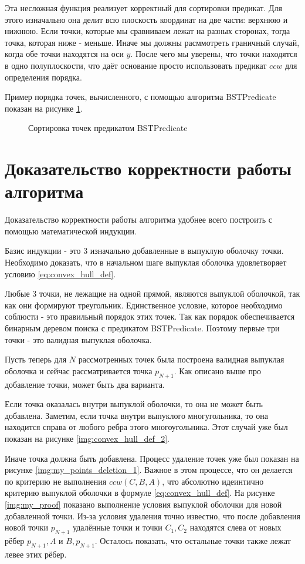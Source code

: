Эта несложная функция реализует корректный для сортировки предикат. Для этого изначально она делит всю плоскость координат на две части: верхнюю и нижнюю. Если точки, которые мы сравниваем лежат на разных сторонах, тогда точка, которая ниже - меньше. Иначе мы должны расммотреть граничный случай, когда обе точки находятся на оси $y$. После чего мы уверены, что точки находятся в одно полуплоскости, что даёт основание просто использовать предикат $ccw$ для определения порядка.

Пример порядка точек, вычисленного, с помощью алгоритма BSTPredicate показан на рисунке \ref{img:BSTPred_ordering}.

\begin{figure}[H]
	\centering
	
	\caption{Сортировка точек предикатом BSTPredicate}
	\label{img:BSTPred_ordering}
\end{figure}

\section{Доказательство корректности работы алгоритма} \label{subsect2_3}

Доказательство корректности работы алгоритма удобнее всего построить с помощью математической индукции.

Базис индукции - это 3 изначально добавленные в выпуклую оболочку точки. Необходимо доказать, что в начальном шаге выпуклая оболочка удовлетворяет условию \ref{eq:convex_hull_def}.

Любые 3 точки, не лежащие на одной прямой, являются выпуклой оболочкой, так как они формируют треугольник. Единственное условие, которое необходимо соблюсти - это правильный порядок этих точек. Так как порядок обеспечивается бинарным деревом поиска с предикатом BSTPredicate. Поэтому первые три точки - это валидная выпуклая оболочка.

Пусть теперь для $N$ рассмотренных точек была построена валидная выпуклая оболочка и сейчас рассматривается точка $p_{N+1}$. Как описано выше про добавление точки, может быть два варианта.

Если точка оказалась внутри выпуклой оболочки, то она не может быть добавлена. Заметим, если точка внутри выпуклого многугольника, то она находится справа от любого ребра этого многоугольника. Этот случай уже был показан на рисунке \ref{img:convex_hull_def_2}.

Иначе точка должна быть добавлена. Процесс удаление точек уже был показан на рисунке \ref{img:my_points_deletion_1}. Важное в этом процессе, что он делается по критерию не выполнения $ccw(C, B, A)$, что абсолютно идеинтично критерию выпуклой оболочки в формуле \ref{eq:convex_hull_def}. На рисунке \ref{img:my_proof} показано выполнение условия выпуклой оболочки для новой добавленной точки. Из-за условия удаления точно известно, что после добавления новой точки $p_{N+1}$ удалённые точки и точки $C_1, C_2$ находятся слева от новых рёбер $p_{N+1}, A$ и $B, p_{N+1}$. Осталось показать, что остальные точки также лежат левее этих рёбер.

